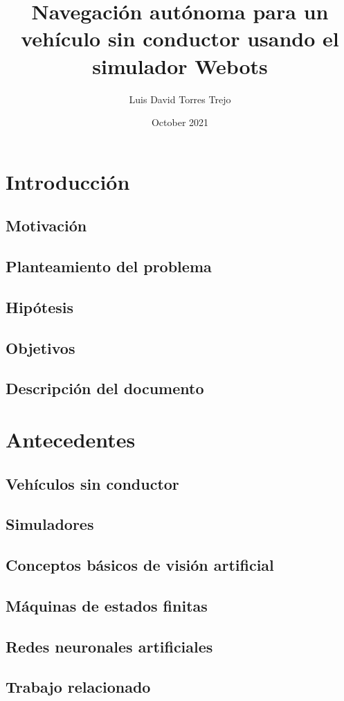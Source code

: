 \documentclass{book}
\title{Navegación autónoma para un vehículo sin conductor usando el simulador Webots}
\author{Luis David Torres Trejo}
\date{October 2021}
\begin{document}
\maketitle
\tableofcontents


\chapter{Introducción}
\section{Motivación}
\section{Planteamiento del problema}
\section{Hipótesis}
\section{Objetivos}
\section{Descripción del documento}

\chapter{Antecedentes}
\section{Vehículos sin conductor}
\section{Simuladores}
\section{Conceptos básicos de visión artificial}
\section{Máquinas de estados finitas}
\section{Redes neuronales artificiales}
\section{Trabajo relacionado}
\end{document}
